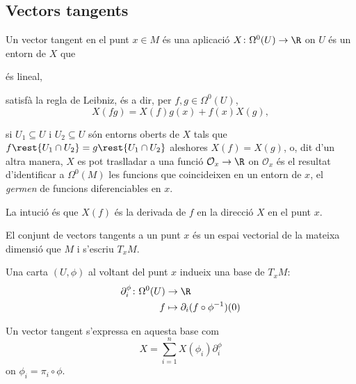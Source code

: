 \documentclass[12pt,twocolumn]{article}
\begin{document}
\subsection{Vectors tangents}
\begin{definition}
	Un vector tangent en el punt \( x \in M \) és una aplicació \( X \colon \Omega^0(U) \to
	\R \) on \( U \) és un entorn de \( X \) que
	\begin{points}
	\item és lineal,
	\item satisfà la regla de Leibniz, és a dir, per \( f, g \in \Omega^0(U) \),
		\begin{equation*}
			X(fg) = X(f)g(x) + f(x)X(g),
		\end{equation*}
	\item si \( U_1 \subseteq U \) i \( U_2 \subseteq U \) són entorns oberts de \( X \)
		tals que \( f\rest{U_1 \cap U_2} = g \rest{U_1 \cap U_2} \) aleshores \( X(f) = X(g)
		\), o, dit d'un altra manera, \( X \) es pot traslladar a una funció \( \mathcal{O}_x
		\to \R \) on \( \mathcal{O}_x \) és el resultat d'identificar a \( \Omega^0(M) \) les
		funcions que coincideixen en un entorn de \( x \), el \emph{germen} de funcions
		diferenciables en \( x \).  
	\end{points}
\end{definition}
La intució és que \( X(f) \) és la derivada de \( f \) en la direcció \( X \) en el punt \( x \). 
\begin{definition}
	El conjunt de vectors tangents a un punt \( x \) és un espai vectorial de la mateixa
	dimensió que \( M \) i s'escriu \( T_x M \).
\end{definition}

\begin{definition}
	Una carta \( (U,\phi) \) al voltant del punt \( x \) indueix una base de \( T_xM \):
	\begin{align*}
		\partial_i^\phi \colon \Omega^0(U) & \to \R \\
		f & \mapsto \partial_i(f \circ \phi^{-1})(0)
	\end{align*}

	Un vector tangent s'expressa en aquesta base com
	\begin{equation*}
		X = \sum_{i = 1}^{n} X(\phi_i)\partial_i^{\phi} 
	\end{equation*}
	on \( \phi_i = \pi_i \circ \phi \). 
\end{definition}
\end{document}
